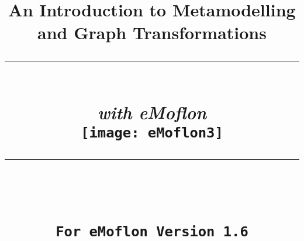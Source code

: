 \def\versionNumber{1.6} 

\title{
\flushright
{\LARGE\bfseries An Introduction to Metamodelling\\
and Graph Transformations}
\noindent\rule[-1ex]{\textwidth}{5pt}\\[2.5ex]
\hfill\emph{\LARGE\bfseries with eMoflon}\\
\flushright
\texttt{[image: eMoflon3]}
\flushleft
\vspace{3cm}
\noindent\rule[-1ex]{0.5\textwidth}{1.5pt}\\[1.5 ex]
{\LARGE\bfseries \partTitle}\\
{\small \texttt{For eMoflon Version \versionNumber}}
}

\date{}  
\author{} 